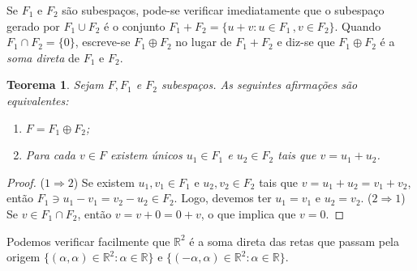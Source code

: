 \documentclass[12pt,a4paper]{article}
\newcommand{\R}{\mathbb{R}}
\newtheorem{thm}{Teorema}[section]
\theoremstyle{definition}
\begin{document}
Se $F_1$ e $F_2$ são subespaços, pode-se verificar imediatamente que o
subespaço gerado por $F_1\cup F_2$ é o conjunto
$F_1+F_2=\{u+v:u\in F_1\,,v\in F_2\}$. Quando $F_1\cap F_2=\{0\}$,
escreve-se $F_1\oplus F_2$ no lugar de $F_1+F_2$ e diz-se que
$F_1\oplus F_2$ é a \textit{soma direta} de $F_1$ e $F_2$.

\begin{thm}
  Sejam $F,F_1$ e $F_2$ subespaços. As seguintes afirmações são
  equivalentes:
  \begin{enumerate}
  \item $F=F_1\oplus F_2$;
  \item Para cada $v\in F$ existem únicos $u_1\in F_1$ e $u_2\in F_2$
    tais que $v=u_1+u_2$.
  \end{enumerate}
\end{thm}
\begin{proof}
  ($1\Rightarrow 2$) Se existem $u_1,v_1\in F_1$ e $u_2,v_2\in F_2$
  tais que $v=u_1+u_2=v_1+v_2$, então $F_1\ni u_1-v_1=v_2-u_2\in
  F_2$. Logo, devemos ter $u_1=v_1$ e $u_2=v_2$. ($2\Rightarrow 1$) Se
  $v\in F_1\cap F_2$, então $v=v+0=0+v$, o que implica que $v=0$.
\end{proof}

Podemos verificar facilmente que $\R^2$ é a soma direta das retas que
passam pela origem $\{(\alpha,\alpha)\in\R^2:\alpha\in\R\}$ e
$\{(-\alpha,\alpha)\in\R^2:\alpha\in\R\}$.

\end{document}
